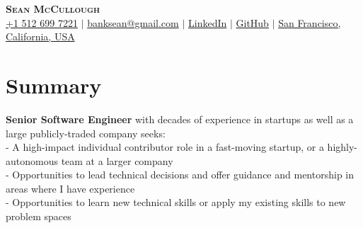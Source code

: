 \documentclass[letterpaper,11pt]{article}
\newcommand{\resumeSubHeadingListStart}{\begin{itemize}[leftmargin=0.15in, label={}]}
\newcommand{\resumeSubHeadingListEnd}{\end{itemize}}
\begin{document}

\begin{center}
    \textbf{\Huge \scshape Sean McCullough} \\ \vspace{3pt}
    \small
    \faMobile \hspace{.5pt} \href{tel:15126997221}{+1 512 699 7221}
    $|$
    \faAt \hspace{.5pt} \href{mailto:banksean@gmail.com}{banksean@gmail.com}
    $|$
    \faLinkedinSquare \hspace{.5pt} \href{https://www.linkedin.com/in/seanmccullough/}{LinkedIn}
    $|$
    \faGithub \hspace{.5pt} \href{https://github.com/banksean}{GitHub}
    $|$
    \faMapMarker \hspace{.5pt} \href{https://maps.app.goo.gl/qZ2iPhKzdnsEXERw8}{San Francisco, California, USA}
\end{center}


\section{Summary}
\vspace{2pt}
\resumeSubHeadingListStart
  \small{\item{
      \textbf{Senior Software Engineer}{ with decades of experience in startups as well as a large publicly-traded company seeks:} \\ \vspace{3pt}
      \textbf{}{- A high-impact individual contributor role in a fast-moving startup, or a highly-autonomous team at a larger company} \\ \vspace{3pt}
      \textbf{}{- Opportunities to lead technical decisions and offer guidance and mentorship in areas where I have experience } \\ \vspace{3pt}
      \textbf{}{- Opportunities to learn new technical skills or apply my existing skills to new problem spaces } \\ \vspace{3pt}
  }}
\resumeSubHeadingListEnd


\end{document}
